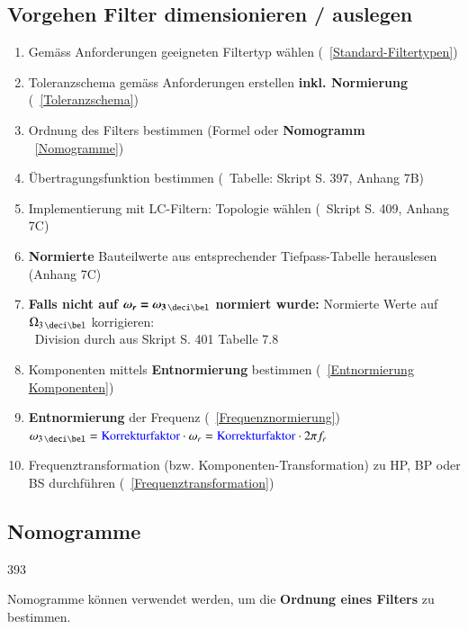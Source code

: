 \subsection{Vorgehen Filter dimensionieren / auslegen}

\begin{enumerate}
    \item Gemäss Anforderungen geeigneten Filtertyp wählen (\textrightarrow\ \ref{Standard-Filtertypen})
    \item Toleranzschema gemäss Anforderungen erstellen \textbf{inkl. Normierung} (\textrightarrow\ \ref{Toleranzschema})
    \item Ordnung des Filters bestimmen (Formel oder \textbf{Nomogramm} \textrightarrow\ \ref{Nomogramme})
    \item Übertragungsfunktion bestimmen (\textrightarrow\ Tabelle: Skript S. 397, Anhang 7B)
    \item Implementierung mit LC-Filtern: Topologie wählen (\textrightarrow\ Skript S. 409, Anhang 7C)
    \item \textbf{Normierte} Bauteilwerte aus entsprechender Tiefpass-Tabelle herauslesen (Anhang 7C)
    \item \textbf{Falls nicht auf $\bm{\omega_r = \omega_{3 \, \deci \bel}}$ normiert wurde:} Normierte Werte auf $\Omega_{3 \, \deci \bel}$ korrigieren: \\
         \textrightarrow\ Division durch  aus Skript S. 401 Tabelle 7.8
    \item Komponenten mittels \textbf{Entnormierung} bestimmen (\textrightarrow\ \ref{Entnormierung Komponenten})
    \item \textbf{Entnormierung} der Frequenz (\textrightarrow\ \ref{Frequenznormierung})\\
        $\omega_{3 \, \deci \bel} = \text{\cbl{Korrekturfaktor}} \cdot \omega_r = \text{\cbl{Korrekturfaktor}} \cdot 2 \pi f_r $
    \item Frequenztransformation (bzw. Komponenten-Transformation) zu HP, BP oder BS durchführen (\textrightarrow\ \ref{Frequenztransformation})
\end{enumerate}


\subsection{Nomogramme}{393}
\label{Nomogramme}

Nomogramme können verwendet werden, um die \textbf{Ordnung eines Filters}  zu bestimmen.

